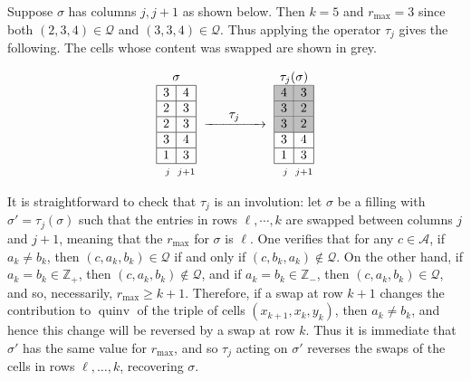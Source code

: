 \documentclass[ALCO,Unicode]{cedram}
\DeclareMathOperator{\quinv}{quinv}
\newcommand{\cQ}{\mathcal{Q}}
\begin{document}
\begin{example}\label{ex:tau}
Suppose $\sigma$ has columns $j,j+1$ as shown below. Then $k=5$ and $r_{\max}=3$ since both $(2,3,4)\in\cQ$ and $(3,3,4)\in\cQ$. Thus applying the operator $\tau_j$ gives the following. The cells whose content was swapped are shown in grey.


\begin{equation*}
\renewcommand{\arraystretch}{1}  
\setlength{\arraycolsep}{1pt} 
\begin{array}{|c|c|}
\multicolumn{2}{c}{\sigma}
\\
\hline
3 &  4\\
\hline
2 & 3  \\
\hline
2 & 3 \\
\hline
3 & 4\\
\hline
1 & 3 \\
\hline
\multicolumn{1}{c}{\scriptstyle \phantom{+} j\phantom{1}}&
\multicolumn{1}{c}{\scriptstyle j+1}
\end{array}
\,\,\xrightarrow{\makebox[1.5cm]{$\tau_j$}}\,\,
\begin{array}{|c|c|}
\multicolumn{2}{c}{\tau_j(\sigma)}
\\
\hline
\cellcolor{gray!50}4 & \cellcolor{gray!50} 3\\
\hline
\cellcolor{gray!50}3 & \cellcolor{gray!50}2  \\
\hline
\cellcolor{gray!50}3 & \cellcolor{gray!50}2 \\
\hline
3 & 4\\
\hline
1 & 3 \\
\hline
\multicolumn{1}{c}{\scriptstyle \phantom{+} j\phantom{1}}&
\multicolumn{1}{c}{\scriptstyle j+1}
\end{array}
\end{equation*}

\end{example}

It is straightforward to check that $\tau_j$ is an involution: let $\sigma$ be a filling with $\sigma'=\tau_j(\sigma)$ such that the entries in rows $\ell,\cdots,k$ are swapped between columns $j$ and $j+1$, meaning that the $r_{\max}$ for $\sigma$ is $\ell$. One verifies that for any $c\in\mathcal{A}$, if $a_k\neq b_k$, then $(c,a_{k},b_{k})\in\cQ$ if and only if $(c,b_k,a_k)\not\in\cQ$. On the other hand, if $a_k= b_k\in\mathbb{Z}_+$, then $(c,a_{k},b_{k}) \not\in\cQ$, and if $a_k= b_k\in\mathbb{Z}_-$, then $(c,a_{k},b_{k})\in\cQ$, and so, necessarily, $r_{\max}\geq k+1$. Therefore, if a swap at row $k+1$ changes the contribution to $\quinv$ of the triple of cells $(x_{k+1},x_k,y_k)$, then $a_k\neq b_k$, and hence this change will be reversed by a swap at row $k$. Thus it is immediate that $\sigma'$ has the same value for $r_{\max}$, and so $\tau_j$ acting on $\sigma'$ reverses the swaps of the cells in rows $\ell,\dots,k$, recovering $\sigma$. 
\end{document}
